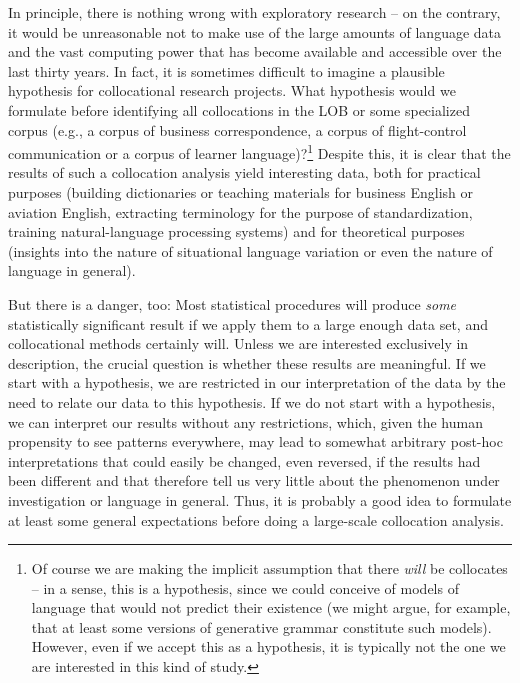 In principle, there is nothing wrong with exploratory  research -- on the contrary, it would be unreasonable not to make use of the large amounts of language data and the vast computing power that has become available and accessible over the last thirty years. In fact, it is sometimes difficult to imagine a plausible hypothesis for collocational  research projects. What hypothesis would we formulate before identifying all collocations in the LOB  or some specialized corpus (e.g., a corpus of business correspondence, a corpus of flight\hyp{}control communication or a corpus of learner language)?\footnote{Of course we are making the implicit assumption that there \textit{will} be collocates -- in a sense, this is a hypothesis, since we could conceive of models of language that would not predict their existence (we might argue, for example, that at least some versions of generative  grammar constitute such models). However, even if we accept this as a hypothesis, it is typically not the one we are interested in this kind of study.} Despite this, it is clear that the results of such a collocation  analysis yield interesting data, both for practical purposes (building dictionaries  or teaching materials for business English or aviation English, extracting terminology for the purpose of standardization, training natural\hyp{}language processing systems) and for theoretical purposes (insights into the nature of situational language variation  or even the nature of language in general).

But there is a danger, too: Most statistical procedures will produce \textit{some} statistically significant  result if we apply them to a large  enough data set, and collocational  methods certainly will. Unless we are interested exclusively in description,  the crucial question is whether these results are meaningful. If we start with a hypothesis, we are restricted in our interpretation of the data by the need to relate our data to this hypothesis. If we do not start with a hypothesis, we can interpret our results without any restrictions, which, given the human propensity to see patterns everywhere, may lead to somewhat arbitrary post\hyp{}hoc interpretations that could easily be changed, even reversed, if the results had been different and that therefore tell us very little about the phenomenon under investigation or language in general. Thus, it is probably a good idea to formulate at least some general expectations before doing a large\hyp{}scale collocation  analysis.\largerpage

